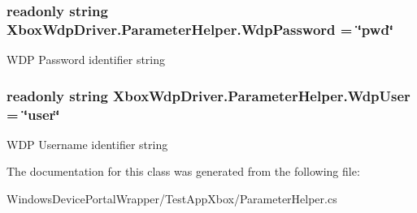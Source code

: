 \subsubsection[{\texorpdfstring{Wdp\+Password}{WdpPassword}}]{\setlength{\rightskip}{0pt plus 5cm}readonly string Xbox\+Wdp\+Driver.\+Parameter\+Helper.\+Wdp\+Password = \char`\"{}pwd\char`\"{}\hspace{0.3cm}{\ttfamily [static]}}\hypertarget{class_xbox_wdp_driver_1_1_parameter_helper_acea1cb42361f521ed5d644db783ef2c6}{}\label{class_xbox_wdp_driver_1_1_parameter_helper_acea1cb42361f521ed5d644db783ef2c6}


W\+DP Password identifier string 

\subsubsection[{\texorpdfstring{Wdp\+User}{WdpUser}}]{\setlength{\rightskip}{0pt plus 5cm}readonly string Xbox\+Wdp\+Driver.\+Parameter\+Helper.\+Wdp\+User = \char`\"{}user\char`\"{}\hspace{0.3cm}{\ttfamily [static]}}\hypertarget{class_xbox_wdp_driver_1_1_parameter_helper_ad561cf66a2e9f5179a3343f76df3010e}{}\label{class_xbox_wdp_driver_1_1_parameter_helper_ad561cf66a2e9f5179a3343f76df3010e}


W\+DP Username identifier string 



The documentation for this class was generated from the following file\+:\begin{DoxyCompactItemize}
\item 
Windows\+Device\+Portal\+Wrapper/\+Test\+App\+Xbox/Parameter\+Helper.\+cs\end{DoxyCompactItemize}
